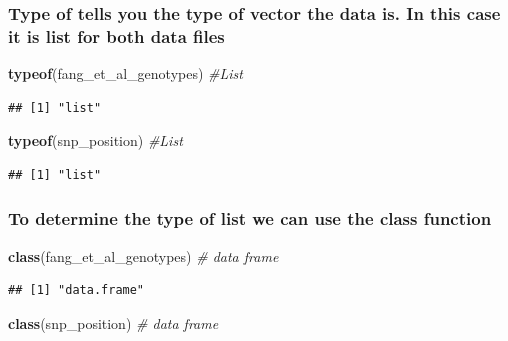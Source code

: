 \documentclass[
]{article}
\newenvironment{Shaded}{\begin{snugshade}}{\end{snugshade}}
\newcommand{\CommentTok}[1]{\textcolor[rgb]{0.56,0.35,0.01}{\textit{#1}}}
\newcommand{\FunctionTok}[1]{\textcolor[rgb]{0.13,0.29,0.53}{\textbf{#1}}}
\newcommand{\NormalTok}[1]{#1}
\begin{document}
\subsubsection{Type of tells you the type of vector the data is. In this
case it is list for both data
files}\label{type-of-tells-you-the-type-of-vector-the-data-is.-in-this-case-it-is-list-for-both-data-files}

\begin{Shaded}
\begin{Highlighting}[]
\FunctionTok{typeof}\NormalTok{(fang\_et\_al\_genotypes) }\CommentTok{\#List}
\end{Highlighting}
\end{Shaded}

\begin{verbatim}
## [1] "list"
\end{verbatim}

\begin{Shaded}
\begin{Highlighting}[]
\FunctionTok{typeof}\NormalTok{(snp\_position) }\CommentTok{\#List}
\end{Highlighting}
\end{Shaded}

\begin{verbatim}
## [1] "list"
\end{verbatim}

\subsubsection{To determine the type of list we can use the class
function}\label{to-determine-the-type-of-list-we-can-use-the-class-function}

\begin{Shaded}
\begin{Highlighting}[]
\FunctionTok{class}\NormalTok{(fang\_et\_al\_genotypes) }\CommentTok{\# data frame}
\end{Highlighting}
\end{Shaded}

\begin{verbatim}
## [1] "data.frame"
\end{verbatim}

\begin{Shaded}
\begin{Highlighting}[]
\FunctionTok{class}\NormalTok{(snp\_position) }\CommentTok{\# data frame}
\end{Highlighting}
\end{Shaded}
\end{document}
